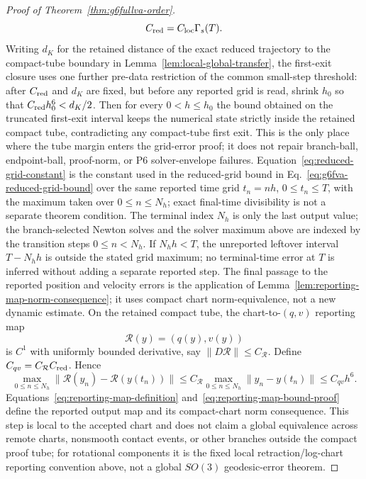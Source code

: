 \documentclass[preprint,12pt]{elsarticle}
\begin{document}
\begin{proof}[Proof of Theorem~\ref{thm:g6fullva-order}]
\begin{equation}
\label{eq:reduced-grid-constant}
  C_{\rm red}=C_{\rm loc}\Gamma_s(T).
\end{equation}
Writing \(d_K\) for the retained distance of the exact reduced trajectory to
the compact-tube boundary in Lemma~\ref{lem:local-global-transfer}, the
first-exit closure uses one further pre-data restriction of the common
small-step threshold: after \(C_{\rm red}\) and \(d_K\) are fixed, but before
any reported grid is read, shrink \(h_0\) so that
\(C_{\rm red}h_0^6<d_K/2\).  Then for every \(0<h\le h_0\) the bound obtained
on the truncated first-exit interval keeps the numerical state strictly
inside the retained compact tube, contradicting any compact-tube first exit.
This is the only place where the tube margin enters the grid-error proof; it
does not repair branch-ball, endpoint-ball, proof-norm, or P6
solver-envelope failures.  Equation~\eqref{eq:reduced-grid-constant} is the
constant used in
the reduced-grid bound in Eq.~\eqref{eq:g6fva-reduced-grid-bound}
over the same reported time grid \(t_n=n h\), \(0\le t_n\le T\), with the
maximum taken over \(0\le n\le N_h\); exact final-time divisibility is not a
separate theorem condition. The terminal index \(N_h\) is only the last output
value; the branch-selected Newton solves and the solver maximum above are
indexed by the transition steps \(0\le n<N_h\). If \(N_hh<T\), the
unreported leftover interval \(T-N_hh\) is outside the stated grid maximum;
no terminal-time error at \(T\) is inferred without adding a separate
reported step. The final passage to
the reported position and velocity errors is the application of
Lemma~\ref{lem:reporting-map-norm-consequence}; it uses compact chart
norm-equivalence, not a new dynamic estimate. On the retained compact tube, the
chart-to-\((q,v)\) reporting map
\begin{equation}
\label{eq:reporting-map-definition}
  \mathcal R(y)=(q(y),v(y))
\end{equation}
is \(C^1\) with uniformly bounded derivative, say
\(\|D\mathcal R\|\le C_{\mathcal R}\). Define
\(C_{qv}=C_{\mathcal R}C_{\rm red}\). Hence
\begin{equation}
\label{eq:reporting-map-bound-proof}
  \max_{0\le n\le N_h}\|\mathcal R(y_n)-\mathcal R(y(t_n))\|
  \le C_{\mathcal R}\max_{0\le n\le N_h}\|y_n-y(t_n)\|
  \le C_{qv}h^6.
\end{equation}
Equations~\eqref{eq:reporting-map-definition}
and~\eqref{eq:reporting-map-bound-proof} define the reported output map and
its compact-chart norm consequence.
This step is local to the accepted chart and does not claim a global
equivalence across remote charts, nonsmooth contact events, or other branches
outside the compact proof tube; for rotational components it is the fixed
local retraction/log-chart reporting convention above, not a global
\(SO(3)\) geodesic-error theorem.
\end{proof}
\end{document}
